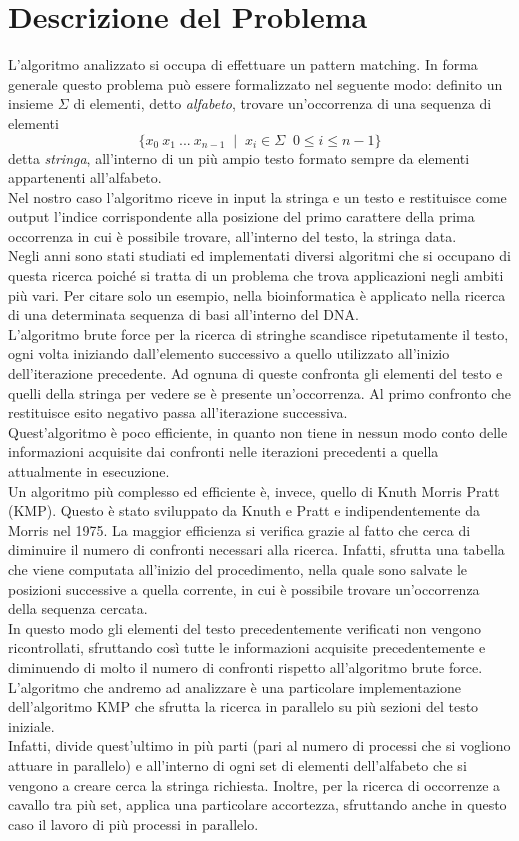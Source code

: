 \chapter{Descrizione del Problema}
L'algoritmo analizzato si occupa di effettuare un pattern matching. In forma generale questo problema può essere formalizzato nel seguente modo: definito un insieme $\Sigma$ di elementi, detto {\itshape alfabeto}, trovare un'occorrenza di una sequenza di elementi $$\{x_0\:x_1\: ...\:x_{n-1} \;\; | \;\; x_i \in \Sigma\;\; 0\le i \le n-1\}$$ detta {\itshape stringa}, all'interno di un più ampio testo formato sempre da elementi appartenenti all'alfabeto.\\ Nel nostro caso l'algoritmo riceve in input la stringa e un testo e restituisce come output l'indice corrispondente alla posizione del  primo carattere della prima occorrenza in cui è possibile trovare, all'interno del testo, la stringa data.\\ 
Negli anni sono stati studiati ed implementati diversi algoritmi che si occupano di questa ricerca poiché si tratta di un problema che trova applicazioni negli ambiti più vari. Per citare solo un esempio, nella bioinformatica è applicato nella ricerca di una determinata sequenza di basi all'interno del DNA.\\
L'algoritmo brute force per la ricerca di stringhe scandisce ripetutamente il testo, ogni volta iniziando dall'elemento successivo a quello utilizzato all'inizio dell'iterazione precedente. Ad ognuna di queste confronta gli elementi del testo e quelli della stringa per vedere se è presente un'occorrenza. Al primo confronto che restituisce esito negativo passa all'iterazione successiva.\\ Quest'algoritmo è poco efficiente, in quanto non tiene in nessun modo conto delle informazioni acquisite dai confronti nelle iterazioni precedenti a quella attualmente in esecuzione.\\
Un algoritmo più complesso ed efficiente è, invece, quello di Knuth Morris Pratt (KMP). Questo è stato sviluppato da Knuth e Pratt e indipendentemente da Morris nel 1975. La maggior efficienza si verifica grazie al fatto che cerca di diminuire il numero di confronti necessari alla ricerca. Infatti, sfrutta una tabella che viene computata all'inizio del procedimento, nella quale sono salvate le posizioni successive a quella corrente, in cui è possibile trovare un'occorrenza della sequenza cercata. \\
In questo modo gli elementi del testo precedentemente verificati non vengono ricontrollati, sfruttando così tutte le informazioni acquisite precedentemente e diminuendo di molto il numero di confronti rispetto all'algoritmo brute force.\\
L'algoritmo che andremo ad analizzare è una particolare implementazione dell'algoritmo KMP che sfrutta la ricerca in parallelo su più sezioni del testo iniziale. \\
Infatti, divide quest'ultimo in più parti (pari al numero di processi che si vogliono attuare in parallelo) e all'interno di ogni set di elementi dell'alfabeto che si vengono a creare cerca la stringa richiesta. Inoltre, per la ricerca di occorrenze a cavallo tra più set, applica una particolare accortezza, sfruttando anche in questo caso il lavoro di più processi in parallelo. 